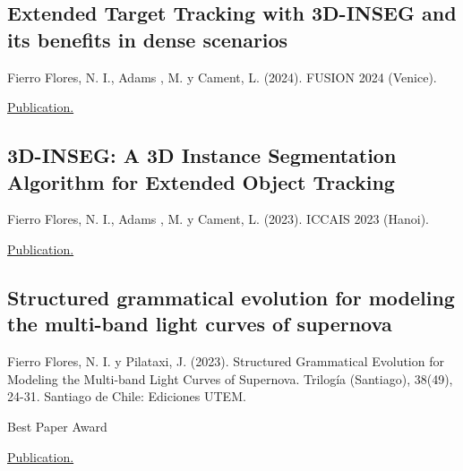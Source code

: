 \subsection{Extended Target Tracking with 3D-INSEG and its
benefits in dense scenarios}
\begin{zitemize}
    \item Fierro Flores, N. I., Adams , M. y Cament, L.
(2024). FUSION 2024 (Venice).  
\item \href{https://ieeexplore.ieee.org/document/10706460}{Publication.}
\end{zitemize}

\subsection{3D-INSEG: A 3D Instance Segmentation Algorithm for Extended Object Tracking}
\begin{zitemize}
    \item Fierro Flores, N. I., Adams , M. y Cament, L.
(2023). ICCAIS 2023 (Hanoi).  
\item \href{https://ieeexplore.ieee.org/document/10382343}{Publication.}
\end{zitemize}

\subsection{Structured grammatical evolution for modeling the multi-band light curves of supernova}
\begin{zitemize}
    \item Fierro Flores, N. I. y Pilataxi, J.
(2023). Structured Grammatical Evolution for Modeling the
Multi-band Light Curves of
Supernova. Trilogía (Santiago),
38(49), 24-31. Santiago de
Chile: Ediciones UTEM.
\item Best Paper Award
\item \href{https://trilogia.utem.cl/articulos/structured-grammatical-evolution-for-modeling-the-multi-band-light-curves-of-supernova/}{Publication.}
\end{zitemize}


